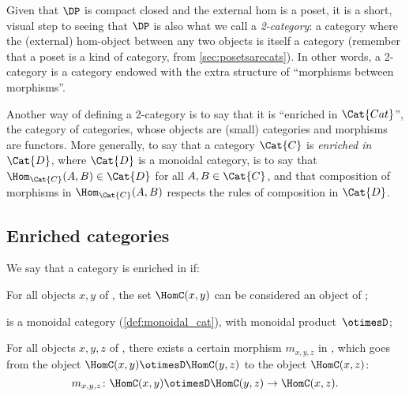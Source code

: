 Given that $\DP$ is compact closed and the external hom is a poset, it is a short, visual step to seeing that $\DP$ is also what we call a \emph{2-category}: a category where the (external) hom-object between any two objects is itself a category (remember that a poset is a kind of category, from \cref{sec:posetsarecats}). In other words, a 2-category is a category endowed with the extra structure of ``morphisms between morphisms''.

Another way of defining a 2-category is to say that it is ``enriched in $\Cat{Cat}$'', the category of categories, whose objects are (small) categories and morphisms are functors. More generally, to say that a category $\Cat{C}$ is \emph{enriched in $\Cat{D}$}, where $\Cat{D}$ is a monoidal category, is to say that $\Hom_\Cat{C}(A,B) \in \Cat{D}$ for all $A,B \in \Cat{C}$, and that composition of morphisms in $\Hom_\Cat{C}(A,B)$ respects the rules of composition in $\Cat{D}$.

\subsection{Enriched categories}

\begin{ctdefinition}
We say that a category \CatC is enriched in \CatD if:
\begin{compactenum}
    \item For all objects $x, y$ of \CatC, the set $\HomC(x,y)$ can be considered an object of \CatD;
    \item \CatD is a monoidal category (\cref{def:monoidal_cat}),
    with monoidal product~$\otimesD$;
    \item For all objects $x, y, z$ of \CatC, there exists
    a certain morphism $m_{x,y,z}$ in \CatD,
    which goes from the object $\HomC(x, y) \otimesD \HomC(y, z)$ to the object $\HomC(x, z)$:
    \begin{equation} \label{eq:enriched-condition}
        m_{x,y,z} \colon \HomC(x, y) \otimesD \HomC(y, z) \to \HomC(x, z) .
    \end{equation}
\end{compactenum}
\end{ctdefinition}

%

